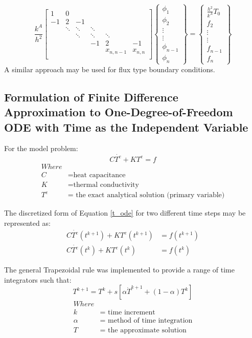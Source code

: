 \documentclass[letterpaper, 10pt, oneside]{article}
\newcommand{\be}{\begin{equation}}
\newcommand{\ee}{\end{equation}}
\newcommand{\as}[1]{\begin{align*}#1\end{align*}}
\newcommand{\an}[1]{\begin{align}#1\end{align}}
\begin{document}
\[\frac{k^A}{h^2}
\begin{bmatrix}
		1		&0 &		&		&			&\\
		-1		&2		& -1	&	 	&			&\\
				&\ddots	& \ddots& \ddots& 			&\\	
				&		& \ddots& \ddots& \ddots	&\\	
				&		&		&-1		& 2			& -1\\		
				& 		&		&		&x_{n,n-1}	&x_{n,n}\\
\end{bmatrix}
\begin{Bmatrix}
	\phi_1 \\ \phi_2 \\ \vdots \\ \vdots \\ \phi_{n-1} \\ \phi_{n}
\end{Bmatrix}
=
\begin{Bmatrix}
	\frac{h^2}{k^A}T_0 \\ f_2 \\ \vdots \\ \vdots \\ f_{n-1} \\ f_{n}
\end{Bmatrix}
\]
A similar approach may be used for flux type boundary conditions.

\subsection{Formulation of Finite Difference Approximation to One-Degree-of-Freedom ODE with Time as the Independent Variable}
For the model problem: 	
\be C\dot{T^e} + KT^e = f \label{t_ode}\ee
\as{Where &\\
	C &= \text{heat capacitance} \\
	K &= \text{thermal conductivity}\\
	T^e &= \text{ the exact analytical solution (primary variable)}}

The discretized form of Equation \ref{t_ode} for two different time steps may be represented as:
\an{C\dot{T^e}(t^{k+1}) + KT^e(t^{k+1}) &= f(t^{k+1}) \label{t1} \\
	C\dot{T^e}(t^{k}) + KT^e(t^{k}) &= f(t^{k}) \label{t2}}

The general Trapezoidal rule was implemented to provide a range of time integrators such that:
\be T^{k+1} = T^k + s\left[\alpha \dot{T}^{k+1} + (1-\alpha)T^k\right] \label{t3}\ee
\as{Where & \\
	k &= \text{ time increment} \\
	\alpha &= \text{ method of time integration} \\
	T &= \text{ the approximate solution}}
\end{document}
